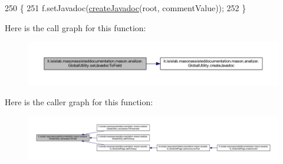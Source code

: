 \begin{DoxyCode}
250                                                                                            \{
251         f.setJavadoc(\hyperlink{classit_1_1isislab_1_1masonassisteddocumentation_1_1mason_1_1analizer_1_1_global_utility_af4c7d391a631bece2ec533b8289044a6}{createJavadoc}(root, commentValue));
252     \}
\end{DoxyCode}


Here is the call graph for this function\-:\nopagebreak
\begin{figure}[H]
\begin{center}
\leavevmode
\includegraphics[width=350pt]{classit_1_1isislab_1_1masonassisteddocumentation_1_1mason_1_1analizer_1_1_global_utility_a92660b0cf490a6351d8d953cad73da58_cgraph}
\end{center}
\end{figure}




Here is the caller graph for this function\-:\nopagebreak
\begin{figure}[H]
\begin{center}
\leavevmode
\includegraphics[width=350pt]{classit_1_1isislab_1_1masonassisteddocumentation_1_1mason_1_1analizer_1_1_global_utility_a92660b0cf490a6351d8d953cad73da58_icgraph}
\end{center}
\end{figure}


